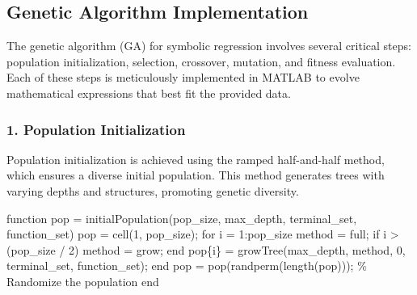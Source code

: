 \documentclass[
  letterpaper,
  DIV=11,
  numbers=noendperiod]{scrartcl}
\newenvironment{Shaded}{\begin{snugshade}}{\end{snugshade}}
\newcommand{\CommentTok}[1]{\textcolor[rgb]{0.37,0.37,0.37}{#1}}
\newcommand{\FloatTok}[1]{\textcolor[rgb]{0.68,0.00,0.00}{#1}}
\newcommand{\KeywordTok}[1]{\textcolor[rgb]{0.00,0.23,0.31}{#1}}
\newcommand{\NormalTok}[1]{\textcolor[rgb]{0.00,0.23,0.31}{#1}}
\newcommand{\OperatorTok}[1]{\textcolor[rgb]{0.37,0.37,0.37}{#1}}
\newcommand{\SpecialStringTok}[1]{\textcolor[rgb]{0.13,0.47,0.30}{#1}}
\newcommand{\VariableTok}[1]{\textcolor[rgb]{0.07,0.07,0.07}{#1}}
\begin{document}
\subsection{Genetic Algorithm
Implementation}\label{genetic-algorithm-implementation}

The genetic algorithm (GA) for symbolic regression involves several
critical steps: population initialization, selection, crossover,
mutation, and fitness evaluation. Each of these steps is meticulously
implemented in MATLAB to evolve mathematical expressions that best fit
the provided data.

\subsubsection{1. Population
Initialization}\label{population-initialization}

Population initialization is achieved using the ramped half-and-half
method, which ensures a diverse initial population. This method
generates trees with varying depths and structures, promoting genetic
diversity.

\begin{Shaded}
\begin{Highlighting}[]
\KeywordTok{function} \VariableTok{pop} \OperatorTok{=} \VariableTok{initialPopulation}\NormalTok{(}\VariableTok{pop\_size}\OperatorTok{,} \VariableTok{max\_depth}\OperatorTok{,} \VariableTok{terminal\_set}\OperatorTok{,} \VariableTok{function\_set}\NormalTok{)}
    \VariableTok{pop} \OperatorTok{=} \VariableTok{cell}\NormalTok{(}\FloatTok{1}\OperatorTok{,} \VariableTok{pop\_size}\NormalTok{)}\OperatorTok{;}
    \KeywordTok{for} \VariableTok{i} \OperatorTok{=} \FloatTok{1}\OperatorTok{:}\VariableTok{pop\_size}
        \VariableTok{method} \OperatorTok{=} \SpecialStringTok{\textquotesingle{}full\textquotesingle{}}\OperatorTok{;}
        \KeywordTok{if} \VariableTok{i} \OperatorTok{\textgreater{}}\NormalTok{ (}\VariableTok{pop\_size} \OperatorTok{/} \FloatTok{2}\NormalTok{)}
            \VariableTok{method} \OperatorTok{=} \SpecialStringTok{\textquotesingle{}grow\textquotesingle{}}\OperatorTok{;}
        \KeywordTok{end}
        \VariableTok{pop}\NormalTok{\{}\VariableTok{i}\NormalTok{\} }\OperatorTok{=} \VariableTok{growTree}\NormalTok{(}\VariableTok{max\_depth}\OperatorTok{,} \VariableTok{method}\OperatorTok{,} \FloatTok{0}\OperatorTok{,} \VariableTok{terminal\_set}\OperatorTok{,} \VariableTok{function\_set}\NormalTok{)}\OperatorTok{;}
    \KeywordTok{end}
    \VariableTok{pop} \OperatorTok{=} \VariableTok{pop}\NormalTok{(}\VariableTok{randperm}\NormalTok{(}\VariableTok{length}\NormalTok{(}\VariableTok{pop}\NormalTok{)))}\OperatorTok{;}  \CommentTok{\% Randomize the population}
\KeywordTok{end}
\end{Highlighting}
\end{Shaded}
\end{document}
